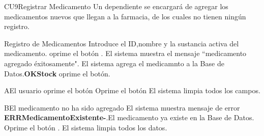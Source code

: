 
% 



	\begin{UseCase}{CU9}{Registrar Medicamento}{
		Un dependiente se encargará de agregar los medicamentos nuevos que llegan a la farmacia, de los cuales no tienen ningún registro.
	}
	\end{UseCase}

	\begin{UCtrayectoria}{Registro de Medicamentos}
		\UCpaso[\UCactor] Introduce el ID,nombre y la sustancia activa del medicamento\label{CU9RegistroMedicamentos}.
		\UCpaso[\UCactor] oprime el botón .
		\UCpaso El sistema muestra el mensaje ``medicamento agregado éxitosamente".
		\UCpaso El sistema agrega el medicamnto a la Base de Datos.{\bf OKStock}
		\UCpaso[\UCactor] oprime el botón.
	\end{UCtrayectoria}
		
		\begin{UCtrayectoriaA}{A}{El usuario oprime el botón }
			\UCpaso[\UCactor]Oprime el botón 
			\UCpaso El sistema limpia todos los campos.  
		\end{UCtrayectoriaA}
		
		
	\begin{UCtrayectoriaA}{B}{El medicamento no ha sido agregado}
			\UCpaso El sistema muestra mensaje de error {\bf ERRMedicamentoExistente-}.El medicamento ya existe en la Base de Datos.
			\UCpaso[\UCactor]Oprime el botón .
			\UCpaso El sistema limpia todos los datos. 
		\end{UCtrayectoriaA}
		
